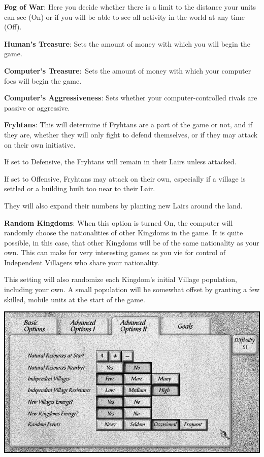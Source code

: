 \textbf{Fog of War}: Here you decide whether there is a limit to the distance your units can see (On) or if you will be able to see all activity in the world at any time (Off).

\textbf{Human’s Treasure}: Sets the amount of money with which you will begin the game.

\textbf{Computer’s Treasure}: Sets the amount of money with which your computer foes will begin the game.

\textbf{Computer’s Aggressiveness}: Sets whether your computer-controlled rivals are passive or aggressive.

\textbf{Fryhtans}: This will determine if Fryhtans are a part of the game or not, and if they are, whether they will only fight to defend themselves, or if they may attack on their own initiative.

\begin{adjustwidth}{1cm}{}
If set to Defensive, the Fryhtans will remain in their Lairs unless attacked.

If set to Offensive, Fryhtans may attack on their own, especially if a village is settled or a building built too near to their Lair. 

They will also expand their numbers by planting new Lairs around the land.
\end{adjustwidth}

\textbf{Random Kingdoms}: When this option is turned On, the computer will randomly choose the nationalities of other Kingdoms in the game. It is quite possible, in this case, that other Kingdoms will be of the same nationality as your own. This can make for very interesting games as you vie for control of Independent Villagers who share your nationality.

This setting will also randomize each Kingdom’s initial Village population, including your own. A small population will be somewhat offset by granting a few skilled, mobile units at the start of the game.

\begin{center}
	\includegraphics[width=0.7\linewidth]{Iadvancedoptions2}
\end{center}

